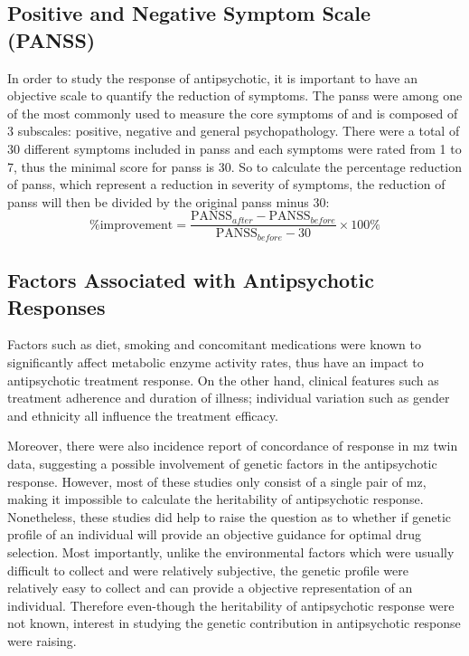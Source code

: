 \documentclass[12pt]{book}
\newcommand*{\glng}{\glsentrylong}
\begin{document}
	\subsection{Positive and Negative Symptom Scale (PANSS)}		
	In order to study the response of antipsychotic, it is important to have an objective scale to quantify the reduction of symptoms.
	The \gls{panss}\citep{Kay1987} were among one of the most commonly used to measure the core symptoms of \glng{scz} and is composed of 3 subscales: positive, negative and general psychopathology.
	There were a total of 30 different symptoms included in \gls{panss} and each symptoms were rated from 1 to 7, thus the minimal score for \gls{panss} is 30.
	So to calculate the percentage reduction of \gls{panss}, which represent a reduction in severity of symptoms, the reduction of \gls{panss} will then be divided by the original \gls{panss} minus 30:
	$$
		\%\text{improvement} = \frac{\text{PANSS}_{after}-\text{PANSS}_{before}}{\text{PANSS}_{before}-30}\times 100\%
	$$
	
	\subsection{Factors Associated with Antipsychotic Responses}
	Factors such as diet, smoking and concomitant medications were known to significantly affect metabolic enzyme activity rates, thus have an impact to antipsychotic treatment response\citep{Arranz2011}.
	On the other hand, clinical features such as treatment adherence and duration of illness; individual variation such as gender and ethnicity all influence the treatment efficacy\citep{Arranz2011}.
	 
	Moreover, there were also incidence report of concordance of response in \gls{mz} twin data\citep{Vojvoda1996,Mata2001}, suggesting a possible involvement of genetic factors in the antipsychotic response.
	However, most of these studies only consist of a single pair of \gls{mz}, making it impossible to calculate the heritability of antipsychotic response.
	Nonetheless, these studies did help to raise the question as to whether if genetic profile of an individual will provide an objective guidance for optimal drug selection.
	Most importantly, unlike the environmental factors which were usually difficult to collect and were relatively subjective, the genetic profile were relatively easy to collect and can provide a objective representation of an individual.
	Therefore even-though the heritability of antipsychotic response were not known, interest in studying the genetic contribution in antipsychotic response were raising.
	
\end{document}
